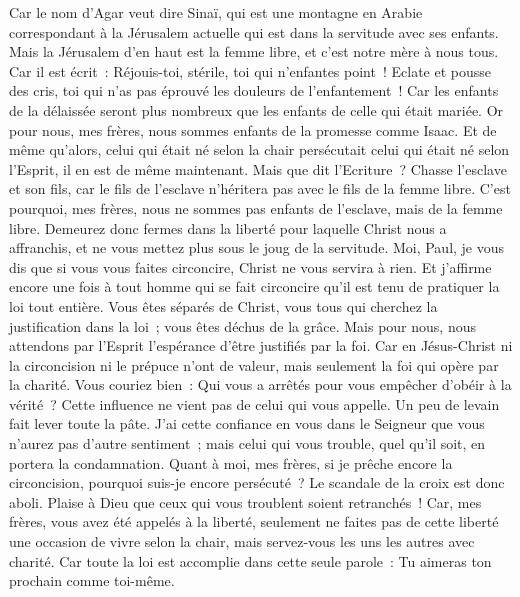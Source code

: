 \begin{multicols}{2}
Car le nom d'Agar veut dire Sinaï, qui est une montagne en Arabie correspondant à la Jérusalem actuelle qui est dans la servitude avec ses enfants.
Mais la Jérusalem d'en haut est la femme libre, et c'est notre mère à nous tous.
Car il est écrit~: Réjouis-toi, stérile, toi qui n'enfantes point~! Eclate et pousse des cris, toi qui n'as pas éprouvé les douleurs de l'enfantement~! Car les enfants de la délaissée seront plus nombreux que les enfants de celle qui était mariée.
Or pour nous, mes frères, nous sommes enfants de la promesse comme Isaac.
Et de même qu'alors, celui qui était né selon la chair persécutait celui qui était né selon l'Esprit, il en est de même maintenant.
Mais que dit l'Ecriture~? Chasse l'esclave et son fils, car le fils de l'esclave n'héritera pas avec le fils de la femme libre.
C'est pourquoi, mes frères, nous ne sommes pas enfants de l'esclave, mais de la femme libre.
\VerseOne{}Demeurez donc fermes dans la liberté pour laquelle Christ nous a affranchis, et ne vous mettez plus sous le joug de la servitude.
Moi, Paul, je vous dis que si vous vous faites circoncire, Christ ne vous servira à rien.
Et j'affirme encore une fois à tout homme qui se fait circoncire qu'il est tenu de pratiquer la loi tout entière.
Vous êtes séparés de Christ, vous tous qui cherchez la justification dans la loi~; vous êtes déchus de la grâce.
Mais pour nous, nous attendons par l'Esprit l'espérance d'être justifiés par la foi.
Car en Jésus-Christ ni la circoncision ni le prépuce n'ont de valeur, mais seulement la foi qui opère par la charité.
Vous couriez bien~: Qui vous a arrêtés pour vous empêcher d'obéir à la vérité~?
Cette influence ne vient pas de celui qui vous appelle.
Un peu de levain fait lever toute la pâte.
J'ai cette confiance en vous dans le Seigneur que vous n'aurez pas d'autre sentiment~; mais celui qui vous trouble, quel qu'il soit, en portera la condamnation.
Quant à moi, mes frères, si je prêche encore la circoncision, pourquoi suis-je encore persécuté~? Le scandale de la croix est donc aboli.
Plaise à Dieu que ceux qui vous troublent soient retranchés~!
Car, mes frères, vous avez été appelés à la liberté, seulement ne faites pas de cette liberté une occasion de vivre selon la chair, mais servez-vous les uns les autres avec charité.
Car toute la loi est accomplie dans cette seule parole~: Tu aimeras ton prochain comme toi-même.

\end{multicols}
